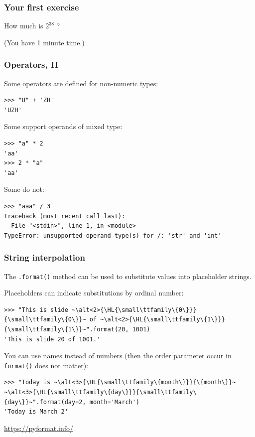 \documentclass[english,serif,mathserif,xcolor=pdftex,dvipsnames,table]{beamer}
\begin{document}
\begin{frame}
  \frametitle{Your first exercise}
  \begin{center}
    {\Large How much is \href{http://www.pythonchallenge.com}{$2^{38}$} ?}

    \+
    (You have 1 minute time.)
  \end{center}
\end{frame}


\begin{frame}[fragile]
  \frametitle{Operators, II}
  Some operators are defined for non-numeric types:
\begin{lstlisting}
>>> "U" + 'ZH'
'UZH'
\end{lstlisting}

  \+
  Some support operands of mixed type:
\begin{lstlisting}
>>> "a" * 2
'aa'
>>> 2 * "a"
'aa'
\end{lstlisting}

  \+
  Some do not:
\begin{lstlisting}[basicstyle=\footnotesize\ttfamily]
>>> "aaa" / 3
Traceback (most recent call last):
  File "<stdin>", line 1, in <module>
TypeError: unsupported operand type(s) for /: 'str' and 'int'
\end{lstlisting}
\end{frame}




\begin{frame}[fragile]
  \frametitle{String interpolation}
  The \lstinline|.format()| method can be used to substitute values into placeholder
  strings.

  \+
  Placeholders can indicate substitutions by ordinal number:
\begin{lstlisting}[basicstyle=\footnotesize\ttfamily]
>>> "This is slide ~\alt<2>{\HL{\small\ttfamily\{0\}}}{\small\ttfamily\{0\}}~ of ~\alt<2>{\HL{\small\ttfamily\{1\}}}{\small\ttfamily\{1\}}~".format(20, 1001)
'This is slide 20 of 1001.'
\end{lstlisting}

  \+
  You can use names instead of numbers (then the order parameter occur in
  \lstinline|format()| does not matter):
\begin{lstlisting}[basicstyle=\footnotesize\ttfamily]
>>> "Today is ~\alt<3>{\HL{\small\ttfamily\{month\}}}{\{month\}}~ ~\alt<3>{\HL{\small\ttfamily\{day\}}}{\small\ttfamily\{day\}}~".format(day=2, month='March')
'Today is March 2'
\end{lstlisting}

  \begin{references}
    \url{https://pyformat.info/}
  \end{references}
\end{frame}
\end{document}
